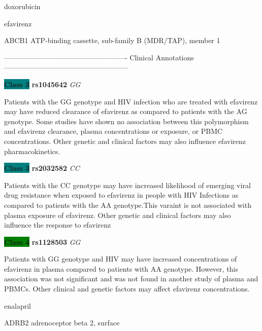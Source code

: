 \documentclass{resume} %
\begin{document}
\begin{rSection}{ doxorubicin }
\end{rSection}\begin{rSection}{ efavirenz }
\item[]

\begin{rSubsection}{ ABCB1 }{ ATP-binding cassette, sub-family B (MDR/TAP), member 1 }{}{}
\item[]

\item[] ---------------------------------------------------- Clinical Annotations -----------------------------------------------------\newline
\item \textbf{\colorbox{teal} {Class 3}} \textbf{ rs1045642 } \textit{ GG }
\item[] Patients with the GG genotype and HIV infection who are treated with efavirenz may have reduced clearance of efavirenz as compared to patients with the AG genotype. Some studies have shown no association between this polymorphism and efavirenz clearance, plasma concentrations or exposure, or PBMC concentrations. Other genetic and clinical factors may also influence efavirenz pharmacokinetics. \item \textbf{\colorbox{teal} {Class 3}} \textbf{ rs2032582 } \textit{ CC }
\item[] Patients with the CC genotype may have increased likelihood of emerging viral drug resistance when exposed to efavirenz in people with HIV Infections as compared to patients with the AA genotype.This varaint is not associated with plasma exposure of efavirenz. Other genetic and clinical factors may also influence the response to efavirenz\item \textbf{\colorbox{green} {Class 4}} \textbf{ rs1128503 } \textit{ GG }
\item[] Patients with GG genotype and HIV may have increased concentrations of efavirenz in plasma compared to patients with AA genotype. However, this association was not significant and was not found in another study of plasma and PBMCs.  Other clinical and genetic factors may affect efavirenz concentrations.
\end{rSubsection}

\end{rSection}\begin{rSection}{ enalapril }
\item[]

\begin{rSubsection}{ ADRB2 }{ adrenoceptor beta 2, surface }{}{}
\item[]


\end{rSubsection}
\end{rSection}
\end{document}

